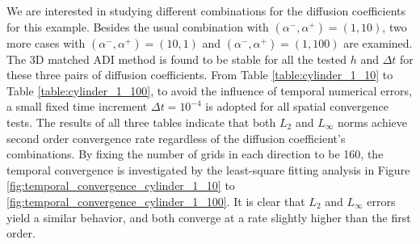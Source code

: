 \documentclass[dissertation]{uathesis}
\begin{document}
\begin{body}
We are interested in studying different combinations for the diffusion coefficients for this example. 
Besides the usual combination with $(\alpha^{-},\alpha^{+})=(1,10)$, two more cases with $(\alpha^{-},\alpha^{+})=(10,1)$ and $(\alpha^{-},\alpha^{+})=(1,100)$ are examined. 
The 3D matched ADI method is found to be stable for all the tested $h$ and $\Delta t$ 
for these three pairs of diffusion coefficients. 
From Table \ref{table:cylinder_1_10} to Table \ref{table:cylinder_1_100}, to avoid the influence of temporal numerical errors, a small fixed time increment $\Delta t=10^{-4}$ is adopted for all spatial convergence tests. The results of all three tables indicate that both $L_2$ and $L_{\infty}$ norms achieve second order convergence rate regardless of the diffusion coefficient's combinations. 
By fixing the number of grids in each direction to be 160,
the temporal convergence is investigated by
the least-square fitting analysis
in Figure \ref{fig:temporal_convergence_cylinder_1_10} to \ref{fig:temporal_convergence_cylinder_1_100}.
It is clear that $L_2$ and $L_{\infty}$ errors yield a similar behavior, and both converge at 
a rate slightly higher than the first order. 


\end{body}
\end{document}
